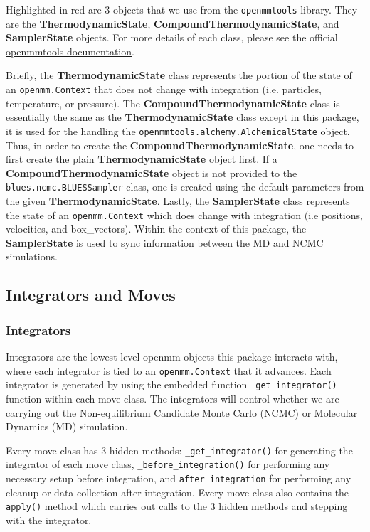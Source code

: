 Highlighted in red are 3 objects that we use from the
\texttt{openmmtools} library. They are the \textbf{ThermodynamicState},
\textbf{CompoundThermodynamicState}, and \textbf{SamplerState} objects.
For more details of each class, please see the official
\href{https://openmmtools.readthedocs.io/en/0.18.1/states.html\#thermodynamic-and-sampler-states}{openmmtools
documentation}.

Briefly, the \textbf{ThermodynamicState} class represents the portion of the state of an \texttt{openmm.Context} that does not change with integration (i.e. particles, temperature, or pressure).
The \textbf{CompoundThermodynamicState} class is essentially the same as the \textbf{ThermodynamicState} class except in this package, it is used for the handling the \texttt{openmmtools.alchemy.AlchemicalState} object.
Thus, in order to create the \textbf{CompoundThermodynamicState}, one needs to first create the plain \textbf{ThermodynamicState} object first. 
If a \textbf{CompoundThermodynamicState} object is not provided to the \texttt{blues.ncmc.BLUESSampler} class, one is created using the default parameters from the given \textbf{ThermodynamicState}. 
Lastly, the \textbf{SamplerState} class represents the state of an \texttt{openmm.Context} which does change with integration (i.e positions, velocities, and box\_vectors). 
Within the context of this package, the \textbf{SamplerState} is used to sync information between the MD and NCMC simulations.

\hypertarget{integrators-and-moves}{%
\subsection{Integrators and Moves}\label{integrators-and-moves}}

\subsubsection{Integrators} 
Integrators are the lowest level openmm objects this package interacts with, where each integrator is tied to an \texttt{openmm.Context} that it advances. 
Each integrator is generated by using the embedded function \texttt{_get_integrator()} function within each move class.
The integrators will control whether we are carrying out the Non-equilibrium Candidate Monte Carlo (NCMC) or Molecular Dynamics (MD) simulation.

Every move class has 3 hidden methods: \texttt{_get_integrator()} for generating the integrator of each move class, \texttt{_before_integration()} for performing any necessary setup before integration, and \texttt{after_integration} for performing any cleanup or data collection after integration. 
Every move class also contains the \texttt{apply()} method which carries out calls to the 3 hidden methods and stepping with the integrator.

